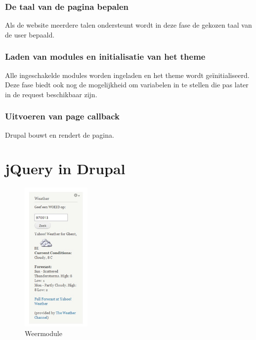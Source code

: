 \subsubsection{De taal van de pagina bepalen}
Als de website meerdere talen ondersteunt wordt in deze fase de gekozen taal van de user bepaald.

\subsubsection{Laden van modules en initialisatie van het theme}
Alle ingeschakelde modules worden ingeladen en het theme wordt ge\"{i}nitialiseerd. Deze fase biedt ook nog de mogelijkheid om variabelen in te stellen die pas later in de request beschikbaar zijn.

\subsubsection{Uitvoeren van page callback}
Drupal bouwt en rendert de pagina.

\newpage

\section{jQuery in Drupal}

\begin{figure}
\vspace{-40pt}
\hspace{-10pt}
\centering
\includegraphics[width=0.3\textwidth]{fig/weermodule}
\vspace{-30pt}
\hspace{-10pt}
\centering
\caption{Weermodule}
\label{fig:weermodule}
\vspace{-70pt}
\end{figure}

